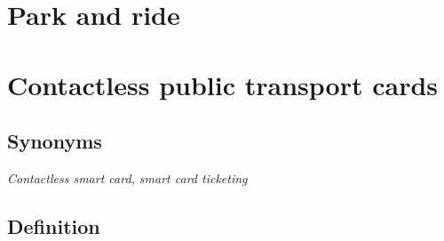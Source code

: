 \documentclass[
]{book}
\begin{document}
\hypertarget{park-and-ride}{%
\section{Park and ride}\label{park-and-ride}}

\hypertarget{contactless-public-transport-cards}{%
\section{Contactless public transport cards}\label{contactless-public-transport-cards}}

\hypertarget{synonyms-6}{%
\subsection*{Synonyms}\label{synonyms-6}}

\emph{Contactless smart card, smart card ticketing}

\hypertarget{definition-7}{%
\subsection*{Definition}\label{definition-7}}
\end{document}
